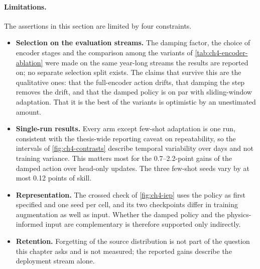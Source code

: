 \paragraph{Limitations.} The assertions in this section are limited by four constraints.
\begin{itemize}
  \item \textbf{Selection on the evaluation streams.} The damping factor, the choice of encoder stages and the comparison among the variants of \cref{tab:ch4-encoder-ablation} were made on the same year-long streams the results are reported on; no separate selection split exists. The claims that survive this are the qualitative ones: that the full-encoder action drifts, that damping the step removes the drift, and that the damped policy is on par with sliding-window adaptation. That it is the best of the variants is optimistic by an unestimated amount.
  \item \textbf{Single-run results.} Every arm except few-shot adaptation is one run, consistent with the thesis-wide reporting caveat on repeatability, so the intervals of \cref{fig:ch4-contrasts} describe temporal variability over days and not training variance. This matters most for the \numrange{0.7}{2.2}-point gains of the damped action over head-only updates. The three few-shot seeds vary by at most \num{0.12} points of skill.
  \item \textbf{Representation.} The crossed check of \cref{fig:ch4-iep} uses the policy as first specified and one seed per cell, and its two checkpoints differ in training augmentation as well as input. Whether the damped policy and the physics-informed input are complementary is therefore supported only indirectly.
  \item \textbf{Retention.} Forgetting of the source distribution is not part of the question this chapter asks and is not measured; the reported gains describe the deployment stream alone.
\end{itemize}

